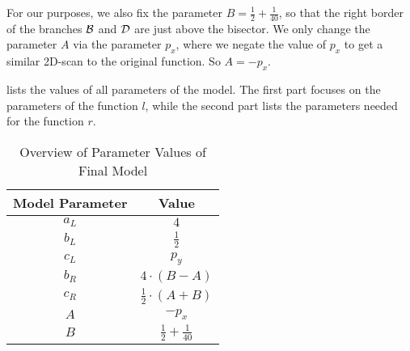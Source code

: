 For our purposes, we also fix the parameter $B = \frac{1}{2} + \frac{1}{40}$, so that the right border of the branches $\mathcal{B}$ and $\mathcal{D}$ are just above the bisector.
We only change the parameter $A$ via the parameter $p_x$, where we negate the value of $p_x$ to get a similar 2D-scan to the original function.
So $A = -p_x$.

 lists the values of all parameters of the model.
The first part focuses on the parameters of the function $l$, while the second part lists the parameters needed for the function $r$.

\begin{table}
    \centering
    \begin{tabular}{|c|c|}
        \hline
        Model Parameter & Value                        \\ \hline \hline
        $a_L$           & $4$                          \\ \hline
        $b_L$           & $\frac{1}{2}$                \\ \hline
        $c_L$           & $p_y$                        \\ \hline \hline
        $b_R$           & $4 \cdot (B - A)$            \\ \hline
        $c_R$           & $\frac{1}{2} \cdot (A + B)$  \\ \hline
        $A$             & $-p_x$                       \\ \hline
        $B$             & $\frac{1}{2} + \frac{1}{40}$ \\ \hline
    \end{tabular}
    \caption{Overview of Parameter Values of Final Model}
    \label{tab:final.def.parameters.overview}
\end{table}
